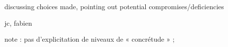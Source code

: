discussing choices  made, pointing out potential compromises/deficiencies

jc, fabien

note : pas d'explicitation de niveaux de « concrétude » ; 